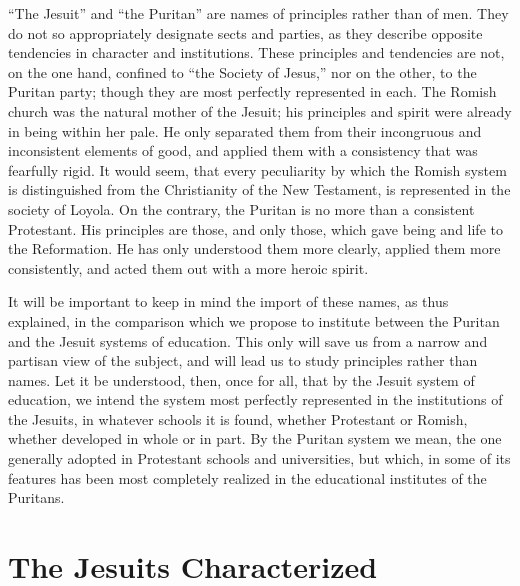 \documentclass[]{book}
\begin{document}
``The Jesuit'' and ``the Puritan'' are names of principles rather than of men. They do not so appropriately designate sects and parties, as they describe opposite tendencies in character and institutions. These principles and tendencies are not, on the one hand, confined to ``the Society of Jesus,'' nor on the other, to the Puritan party; though they are most perfectly represented in each. The Romish church was the natural mother of the Jesuit; his principles and spirit were already in being within her pale. He only separated them from their incongruous and inconsistent elements of good, and applied them with a consistency that was fearfully rigid. It would seem, that every peculiarity by which the Romish system is distinguished from the Christianity of the New Testament, is represented in the society of Loyola. On the contrary, the Puritan is no more than a consistent Protestant. His principles are those, and only those, which gave being and life to the Reformation. He has only understood them more clearly, applied them more consistently, and acted them out with a more heroic spirit.

It will be important to keep in mind the import of these names, as thus explained, in the comparison which we propose to institute between the Puritan and the Jesuit systems of education. This only will save us from a narrow and partisan view of the subject, and will lead us to study principles rather than names. Let it be understood, then, once for all, that by the Jesuit system of education, we intend the system most perfectly represented in the institutions of the Jesuits, in whatever schools it is found, whether Protestant or Romish, whether developed in whole or in part. By the Puritan system we mean, the one generally adopted in Protestant schools and universities, but which, in some of its features has been most completely realized in the educational institutes of the Puritans.

\hypertarget{the-jesuits-characterized}{%
\chapter{The Jesuits Characterized}\label{the-jesuits-characterized}}
\end{document}
